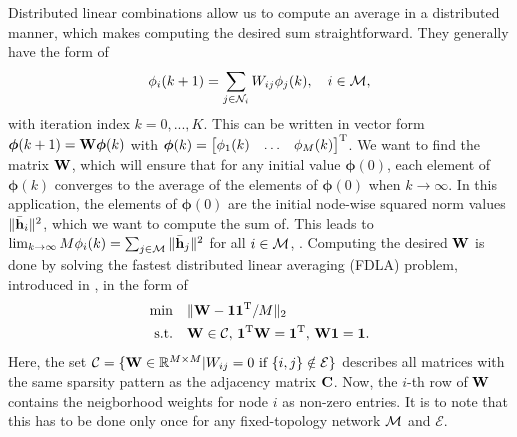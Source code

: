\documentclass{article}
\begin{document}
Distributed linear combinations allow us to compute an average in a distributed manner, which makes computing the desired sum straightforward.
They generally have the form of
\begin{equation}
    \phi_i({k+1}) = \sum_{j \in \mathcal{N}_i} W_{ij} \phi_j({k}),\quad i\in \mathcal{M},\label{eq:adaptivenormest:distlincomb}
\end{equation}
with iteration index \(k=0,...,K\).
This can be written in vector form \(\bm{\phi}({k+1}) = \bm{\mathrm{W}} \bm{\phi}({k})\) with \(\bm{\phi}(k) = \begin{bmatrix} \phi_1(k) & \ldots & \phi_M(k) \end{bmatrix}^{\mathrm{T}}\).
We want to find the matrix \(\bm{\mathrm{W}}\), which will ensure that for any initial value \(\bm{\phi}({0})\), each element of \(\bm{\phi}({k})\) converges to the average of the elements of \(\bm{\phi}({0})\) when \(k \to \infty\).
In this application, the elements of \(\bm{\phi}(0)\) are the initial node-wise squared norm values \(\|\bar{\bm{\mathrm{h}}}_i\|^2\), which we want to compute the sum of.
This leads to \(\lim_{k \to \infty} M \phi_i(k) = \sum_{j \in \mathcal{M}} \|\bar{\bm{\mathrm{h}}}_j\|^2\) for all \(i \in \mathcal{M}\), \cite{xiaoFastLinearIterations2004}.
Computing the desired \(\bm{\mathrm{W}}\) is done by solving the fastest distributed linear averaging (FDLA) problem, introduced in \cite{xiaoFastLinearIterations2004}, in the form of
\begin{equation}
    \begin{aligned}
        \min& \quad \| \bm{\mathrm{W}} - \bm{1}\bm{1}^{\mathrm{T}}/M\|_2\\
        \text{s.t.}& \quad \bm{\mathrm{W}} \in \mathcal{C},\, \bm{1}^{\mathrm{T}} \bm{\mathrm{W}} = \bm{1}^{\mathrm{T}},\, \bm{\mathrm{W}} \bm{1}= \bm{1}.
    \end{aligned}\label{eq:adaptivenormest:fdlaminprob}
\end{equation}
Here, the set \(\mathcal{C} = \{\bm{\mathrm{W}} \in \mathbb{R}^{M \times M} \vert W_{ij} = 0 \text{ if } \{i,j\} \notin \mathcal{E}\}\) describes all matrices with the same sparsity pattern as the adjacency matrix \(\bm{\mathrm{C}}\).
Now, the \(i\)-th row of \(\bm{\mathrm{W}}\) contains the neigborhood weights for node \(i\) as non-zero entries.
It is to note that this has to be done only once for any fixed-topology network \(\mathcal{M}\) and \(\mathcal{E}\).
\end{document}
